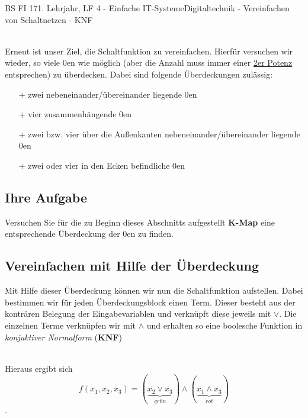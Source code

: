 \documentclass[11pt,twocolumn,oneside,openany,headings=optiontotoc,11pt,numbers=noenddot]{article}
\begin{document}
\begin{worksheet}{BS FI 17}{1. Lehrjahr, LF 4 - Einfache IT-Systeme}{Digitaltechnik - Vereinfachen von Schaltnetzen - KNF}
\begin{karnaugh-map}[4][4][1][$x_3x_4$][$x_1x_2$]
		\end{karnaugh-map}\\
		Erneut ist unser Ziel, die Schaltfunktion zu vereinfachen. Hierfür versuchen wir wieder, so viele \(0\)en wie möglich (aber die Anzahl muss immer einer \underline{2er Potenz} entsprechen) zu überdecken. Dabei sind folgende Überdeckungen zulässig:
		\begin{itemize}
			\item[+] zwei nebeneinander/übereinander liegende \(0\)en
			\item[+] vier zusammenhängende \(0\)en
			\item[+] zwei bzw. vier über die Außenkanten nebeneinander/übereinander liegende \(0\)en
			\item[+] zwei oder vier in den Ecken befindliche \(0\)en
		\end{itemize}
		\begin{karnaugh-map}[4][4][1][$x_3x_4$][$x_1x_2$]
		\end{karnaugh-map}
		\begin{karnaugh-map}[4][4][1][$x_3x_4$][$x_1x_2$]
		\end{karnaugh-map}
		\begin{karnaugh-map}[4][4][1][$x_3x_4$][$x_1x_2$]
		\end{karnaugh-map}
		\begin{karnaugh-map}[4][4][1][$x_3x_4$][$x_1x_2$]
			\implicantcorner
		\end{karnaugh-map}
		\subsection*{Ihre Aufgabe} Versuchen Sie für die zu Beginn dieses Abschnitts aufgestellt \textbf{K-Map} eine entsprechende Überdeckung der \(0\)en zu finden.
		\newpage
		\subsection{Vereinfachen mit Hilfe der Überdeckung}
		Mit Hilfe dieser Überdeckung können wir nun die Schaltfunktion aufstellen. Dabei bestimmen wir für jeden Überdeckungsblock einen Term. Dieser besteht aus der konträren Belegung der Eingabevariablen und verknüpft diese jeweils mit \(\lor\). Die einzelnen Terme verknüpfen wir mit \(\land\) und erhalten so eine boolesche Funktion in \textit{konjuktiver Normalform} (\textbf{KNF})
		\begin{karnaugh-map}[4][2][1][$x_2x_3$][$x_1$]
		\end{karnaugh-map}\\
		Hieraus ergibt sich \[f(x_1,x_2,x_3) = (\underbrace{\overline{x_2}\lor\overline{x_3}}_{grün}) \land (\underbrace{\overline{x_1}\land\overline{x_3}}_{rot})\].\\

\end{worksheet}
\end{document}
